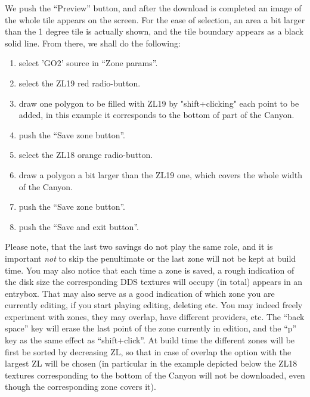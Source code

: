 \documentclass[12pt]{article}
\begin{document}
We push the ``Preview'' button, and after the download is completed an image of the whole tile appears on the screen. For the ease of selection, an area a bit larger than the 1 degree tile is actually shown, and the tile boundary appears as a black solid line. From there, we shall do the following:
\begin{enumerate}
  \item select 'GO2' source in ``Zone params''.
  \item select the ZL19 red radio-button.
  \item draw one polygon to be filled with ZL19 by "shift+clicking" each point to be added, in this example it corresponds to the bottom of part of the Canyon.
  \item push the ``Save zone button''.
  \item select the ZL18 orange radio-button.
  \item draw a polygon a bit larger than the ZL19 one, which covers the whole width of the Canyon.
  \item push the ``Save zone button''.
  \item push the ``Save and exit button''.
\end{enumerate}
Please note, that the last two savings do not play the same role, and it is important {\it not} to skip the penultimate or the last zone will not be kept at build time. You may also notice that each time a zone is saved, a rough indication of the disk size the corresponding DDS textures will occupy (in total) appears in an entrybox. That may also serve as a good indication of which zone you are currently editing, if you start playing editing, deleting etc. You may indeed freely experiment with zones, they may overlap, have different providers, etc. The ``back space'' key will erase the last point of the zone currently in edition, and the ``p'' key as the same effect as ``shift+click''. At build time the different zones will be first be sorted by decreasing ZL, so that in case of overlap the option with the largest ZL will be chosen (in particular in the example depicted below the ZL18 textures corresponding to the bottom of the Canyon will not be downloaded, even though the corresponding zone covers it).
\end{document}
